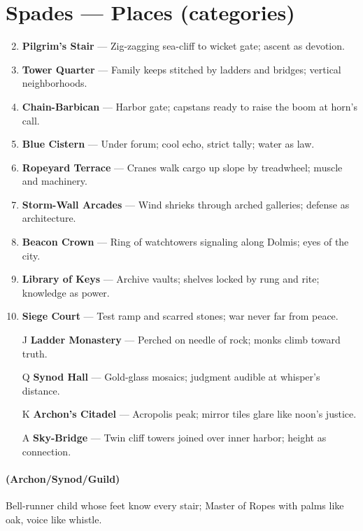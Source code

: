 \section*{Spades --- Places (categories)}
\label{sec:thepyrgos-places}
\begin{enumerate}
\setcounter{enumi}{1}
\item \textbf{Pilgrim's Stair} --- Zig-zagging sea-cliff to wicket gate; ascent as devotion.
\item \textbf{Tower Quarter} --- Family keeps stitched by ladders and bridges; vertical neighborhoods.
\item \textbf{Chain-Barbican} --- Harbor gate; capstans ready to raise the boom at horn's call.
\item \textbf{Blue Cistern} --- Under forum; cool echo, strict tally; water as law.
\item \textbf{Ropeyard Terrace} --- Cranes walk cargo up slope by treadwheel; muscle and machinery.
\item \textbf{Storm-Wall Arcades} --- Wind shrieks through arched galleries; defense as architecture.
\item \textbf{Beacon Crown} --- Ring of watchtowers signaling along Dolmis; eyes of the city.
\item \textbf{Library of Keys} --- Archive vaults; shelves locked by rung and rite; knowledge as power.
\item \textbf{Siege Court} --- Test ramp and scarred stones; war never far from peace.
\item[J] \textbf{Ladder Monastery} --- Perched on needle of rock; monks climb toward truth.
\item[Q] \textbf{Synod Hall} --- Gold-glass mosaics; judgment audible at whisper's distance.
\item[K] \textbf{Archon's Citadel} --- Acropolis peak; mirror tiles glare like noon's justice.
\item[A] \textbf{Sky-Bridge} --- Twin cliff towers joined over inner harbor; height as connection.
\end{enumerate}

\paragraph*{(Archon/Synod/Guild)} Bell-runner child whose feet know every stair; Master of Ropes with palms like oak, voice like whistle.

